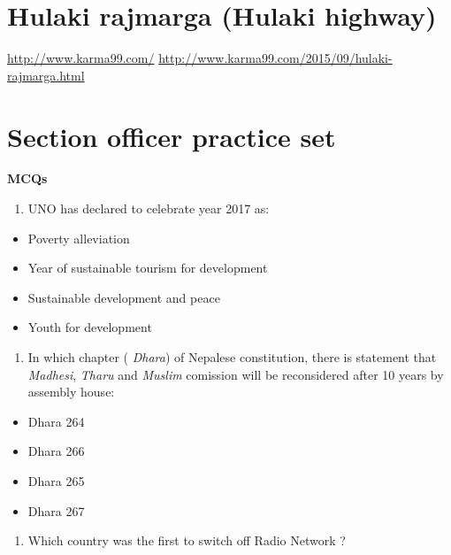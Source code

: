 \documentclass[
]{book}
\providecommand{\tightlist}{%
  \setlength{\itemsep}{0pt}\setlength{\parskip}{0pt}}
\begin{document}
\hypertarget{hulaki-rajmarga-hulaki-highway}{%
\section{Hulaki rajmarga (Hulaki highway)}\label{hulaki-rajmarga-hulaki-highway}}

\url{http://www.karma99.com/}
\url{http://www.karma99.com/2015/09/hulaki-rajmarga.html}

\hypertarget{section-officer-practice-set}{%
\section{Section officer practice set}\label{section-officer-practice-set}}

\textbf{MCQs}

\begin{enumerate}
\def\labelenumi{\arabic{enumi}.}
\tightlist
\item
  UNO has declared to celebrate year 2017 as:
\end{enumerate}

\begin{itemize}
\tightlist
\item
  Poverty alleviation
\item
  Year of sustainable tourism for development
\item
  Sustainable development and peace
\item
  Youth for development
\end{itemize}

\begin{enumerate}
\def\labelenumi{\arabic{enumi}.}
\setcounter{enumi}{1}
\tightlist
\item
  In which chapter ( \emph{Dhara}) of Nepalese constitution, there is statement that \emph{Madhesi}, \emph{Tharu} and \emph{Muslim} comission will be reconsidered after 10 years by assembly house:
\end{enumerate}

\begin{itemize}
\tightlist
\item
  Dhara 264
\item
  Dhara 266
\item
  Dhara 265
\item
  Dhara 267
\end{itemize}

\begin{enumerate}
\def\labelenumi{\arabic{enumi}.}
\setcounter{enumi}{2}
\tightlist
\item
  Which country was the first to switch off Radio Network ?
\end{enumerate}
\end{document}
